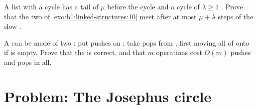 \begin{exercise}[$\star\star\star$]\label{exo:b1:linked-structures:11}
A list with a cycle has a tail of $\mu$  before the cycle and a cycle of $\lambda \geq 1$ . Prove that the two
 of \cref{exo:b1:linked-structures:10} meet after at most $\mu + \lambda$ steps of the slow .
\end{exercise}

\begin{exercise}[$\star\star\star$]\label{exo:b1:linked-structures:12}
A  can be made of two : put pushes on ; take pops from , first moving all of 
onto  if  is empty. Prove that the  is correct, and that $m$ operations cost $O(m)$ pushes and
pops in all.
\end{exercise}

\section{Problem: The Josephus circle}\label{sec:b1:linked-structures:problem}

